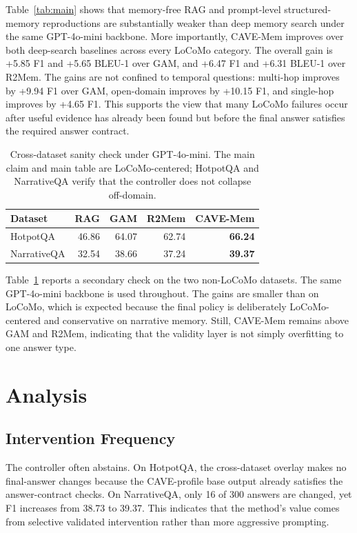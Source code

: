 \documentclass[conference]{IEEEtran}
\newcommand{\method}{CAVE-Mem}
\begin{document}
Table~\ref{tab:main} shows that memory-free RAG and prompt-level
structured-memory reproductions are substantially weaker than deep memory
search under the same GPT-4o-mini backbone. More importantly, \method{}
improves over both deep-search baselines across every LoCoMo category. The
overall gain is +5.85 F1 and +5.65 BLEU-1 over GAM, and +6.47 F1 and +6.31
BLEU-1 over R2Mem. The gains are not confined to temporal questions:
multi-hop improves by +9.94 F1 over GAM, open-domain improves by +10.15 F1,
and single-hop improves by +4.65 F1.
This supports the view that many LoCoMo failures occur after useful evidence
has already been found but before the final answer satisfies the required
answer contract.

\begin{table}[t]
\caption{Cross-dataset sanity check under GPT-4o-mini. The main claim and main
table are LoCoMo-centered; HotpotQA and NarrativeQA verify that the controller
does not collapse off-domain.}
\label{tab:cross}
\centering
\scriptsize
\begin{tabular}{lrrrr}
\toprule
Dataset & RAG & GAM & R2Mem & \method{} \\
\midrule
HotpotQA & 46.86 & 64.07 & 62.74 & \textbf{66.24} \\
NarrativeQA & 32.54 & 38.66 & 37.24 & \textbf{39.37} \\
\bottomrule
\end{tabular}
\end{table}

Table~\ref{tab:cross} reports a secondary check on the two non-LoCoMo datasets.
The same GPT-4o-mini backbone is used throughout. The gains are smaller than
on LoCoMo, which is expected because the final policy is deliberately
LoCoMo-centered and conservative on narrative memory. Still, \method{} remains
above GAM and R2Mem, indicating that the validity layer is not simply
overfitting to one answer type.


\section{Analysis}

\subsection{Intervention Frequency}
The controller often abstains. On HotpotQA, the cross-dataset overlay makes no
final-answer changes because the CAVE-profile base output already satisfies the
answer-contract checks. On NarrativeQA, only 16 of 300 answers are changed, yet
F1 increases from 38.73 to 39.37. This indicates that the method's value comes
from selective validated intervention rather than more aggressive prompting.
\end{document}
